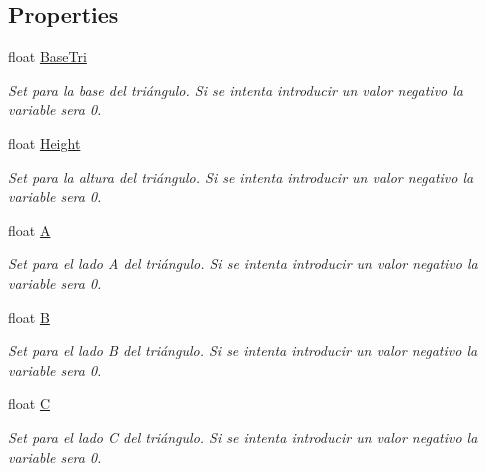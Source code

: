 \subsection*{Properties}
\begin{DoxyCompactItemize}
\item 
float \hyperlink{class_calcular_area_y_perimetro_1_1_tri_xC3_xA1ngulo_a920ba2504420213af32951b4fb7d6c9b}{Base\+Tri}
\begin{DoxyCompactList}\small\item\em Set para la base del triángulo. Si se intenta introducir un valor negativo la variable sera 0. \end{DoxyCompactList}\item 
float \hyperlink{class_calcular_area_y_perimetro_1_1_tri_xC3_xA1ngulo_a03db58b7dc2703d2844fc6391088b891}{Height}
\begin{DoxyCompactList}\small\item\em Set para la altura del triángulo. Si se intenta introducir un valor negativo la variable sera 0. \end{DoxyCompactList}\item 
float \hyperlink{class_calcular_area_y_perimetro_1_1_tri_xC3_xA1ngulo_af3c271639fdbaad3825bba7f0490e13b}{A}
\begin{DoxyCompactList}\small\item\em Set para el lado A del triángulo. Si se intenta introducir un valor negativo la variable sera 0. \end{DoxyCompactList}\item 
float \hyperlink{class_calcular_area_y_perimetro_1_1_tri_xC3_xA1ngulo_a4112d330d1d2b05fc6a2c21d68dfd9d2}{B}
\begin{DoxyCompactList}\small\item\em Set para el lado B del triángulo. Si se intenta introducir un valor negativo la variable sera 0. \end{DoxyCompactList}\item 
float \hyperlink{class_calcular_area_y_perimetro_1_1_tri_xC3_xA1ngulo_a8d249cc94138997fbc0a51a1b54ffd3b}{C}
\begin{DoxyCompactList}\small\item\em Set para el lado C del triángulo. Si se intenta introducir un valor negativo la variable sera 0. \end{DoxyCompactList}\end{DoxyCompactItemize}


